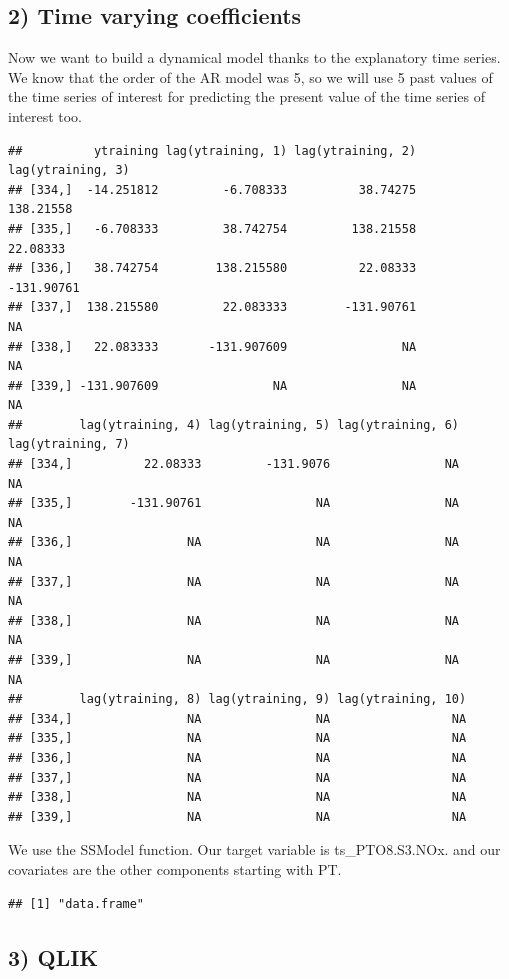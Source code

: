 \documentclass[]{article}
\begin{document}
\subsection{2) Time varying coefficients}

Now we want to build a dynamical model thanks to the explanatory time
series. We know that the order of the AR model was 5, so we will use 5
past values of the time series of interest for predicting the present
value of the time series of interest too.

\begin{verbatim}
##          ytraining lag(ytraining, 1) lag(ytraining, 2) lag(ytraining, 3)
## [334,]  -14.251812         -6.708333          38.74275         138.21558
## [335,]   -6.708333         38.742754         138.21558          22.08333
## [336,]   38.742754        138.215580          22.08333        -131.90761
## [337,]  138.215580         22.083333        -131.90761                NA
## [338,]   22.083333       -131.907609                NA                NA
## [339,] -131.907609                NA                NA                NA
##        lag(ytraining, 4) lag(ytraining, 5) lag(ytraining, 6) lag(ytraining, 7)
## [334,]          22.08333         -131.9076                NA                NA
## [335,]        -131.90761                NA                NA                NA
## [336,]                NA                NA                NA                NA
## [337,]                NA                NA                NA                NA
## [338,]                NA                NA                NA                NA
## [339,]                NA                NA                NA                NA
##        lag(ytraining, 8) lag(ytraining, 9) lag(ytraining, 10)
## [334,]                NA                NA                 NA
## [335,]                NA                NA                 NA
## [336,]                NA                NA                 NA
## [337,]                NA                NA                 NA
## [338,]                NA                NA                 NA
## [339,]                NA                NA                 NA
\end{verbatim}

We use the SSModel function. Our target variable is ts\_PTO8.S3.NOx. and
our covariates are the other components starting with PT.

\begin{verbatim}
## [1] "data.frame"
\end{verbatim}

\subsection{3) QLIK}
\end{document}
